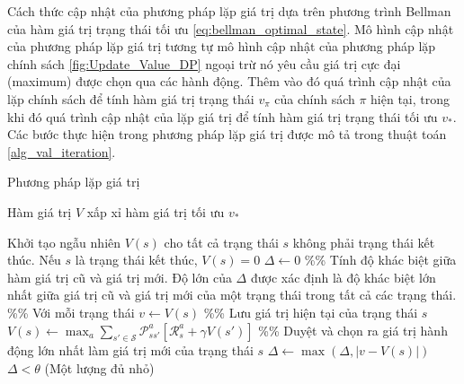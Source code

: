 Cách thức cập nhật của phương pháp lặp giá trị dựa trên phương trình Bellman của hàm giá trị trạng thái tối ưu \ref{eq:bellman_optimal_state}. Mô hình cập nhật của phương pháp lặp giá trị tương tự mô hình cập nhật của phương pháp lặp chính sách \ref{fig:Update_Value_DP} ngoại trừ nó yêu cầu giá trị cực đại (maximum) được chọn qua các hành động. Thêm vào đó quá trình cập nhật của lặp chính sách để tính hàm giá trị trạng thái $v_{\pi}$ của chính sách $\pi$ hiện tại, trong khi đó quá trình cập nhật của lặp giá trị để tính hàm giá trị trạng thái tối ưu $v_*$. Các bước thực hiện trong phương pháp lặp giá trị được mô tả trong thuật toán \ref{alg_val_iteration}.
\begin{algorithm}
	\caption{Phương pháp lặp giá trị}
	\label{alg_val_iteration}
	\begin{algorithmic}[1]
		\renewcommand{\algorithmicrequire}{\textbf{Đầu vào:}}
		\renewcommand{\algorithmicensure}{\textbf{Đầu ra:}}
		\algnewcommand{}
		\algnewcommand\Operation{\item[\algorithmicoperation]}
		
		\Require
		\Ensure Hàm giá trị $V$ xấp xỉ hàm giá trị tối ưu $v_{*}$
		
		\Operation
		\State Khởi tạo ngẫu nhiên $V(s)$ cho tất cả trạng thái $s$ không phải trạng thái kết thúc. Nếu $s$ là trạng thái kết thúc, $V(s) = 0$
		\Repeat
		\State $\Delta \leftarrow 0$ \%\% Tính độ khác biệt giữa hàm giá trị cũ và giá trị mới. Độ lớn của $\Delta$ được xác định là độ khác biệt lớn nhất giữa giá trị cũ và giá trị mới của một trạng thái trong tất cả các trạng thái.
		 \%\% Với mỗi trạng thái
		\State $v \leftarrow V(s)$ \%\% Lưu giá trị hiện tại của trạng thái $s$
		\State $V(s) \leftarrow \max_{a}\sum_{s' \in \mathcal{S}}\mathcal{P}_{ss'}^{a}\left[\mathcal{R}_{s}^{a} + \gamma V(s')\right]$ \%\% Duyệt và chọn ra giá trị hành động lớn nhất làm giá trị mới của trạng thái $s$
		\State $\Delta \leftarrow \max(\Delta,|v - V(s)|)$
		\EndFor
		\Until $\Delta < \theta$ (Một lượng đủ nhỏ)
	\end{algorithmic}
\end{algorithm}

